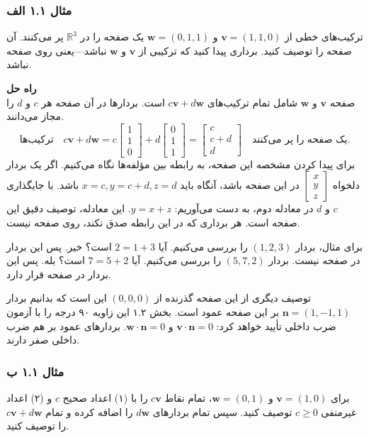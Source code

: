 \documentclass[12pt, a4paper]{book}
\begin{document}
	\subsubsection*{مثال ۱.۱ الف}
	ترکیب‌های خطی از $\mathbf{v} = (1,1,0)$ و $\mathbf{w} = (0,1,1)$ یک صفحه را در $\mathbb{R}^3$ پر می‌کنند. آن صفحه را توصیف کنید. برداری پیدا کنید که ترکیبی از $\mathbf{v}$ و $\mathbf{w}$ نباشد—یعنی روی صفحه نباشد.
	
	\textbf{راه حل} \\
	صفحه $\mathbf{v}$ و $\mathbf{w}$ شامل تمام ترکیب‌های $c\mathbf{v} + d\mathbf{w}$ است. بردارها در آن صفحه هر $c$ و $d$ را مجاز می‌دانند.
	\[ \text{ترکیب‌ها} \quad c\mathbf{v} + d\mathbf{w} = c\begin{bmatrix} 1 \\ 1 \\ 0 \end{bmatrix} + d\begin{bmatrix} 0 \\ 1 \\ 1 \end{bmatrix} = \begin{bmatrix} c \\ c+d \\ d \end{bmatrix} \quad \text{یک صفحه را پر می‌کنند.} \]
	برای پیدا کردن مشخصه این صفحه، به رابطه بین مؤلفه‌ها نگاه می‌کنیم. اگر یک بردار دلخواه $\begin{bmatrix} x \\ y \\ z \end{bmatrix}$ در این صفحه باشد، آنگاه باید $x=c, y=c+d, z=d$ باشد. با جایگذاری $c$ و $d$ در معادله دوم، به دست می‌آوریم: $y = x+z$. این معادله، توصیف دقیق این صفحه است. هر برداری که در این رابطه صدق نکند، روی صفحه نیست.
	
	برای مثال، بردار $(1,2,3)$ را بررسی می‌کنیم. آیا $2 = 1+3$ است؟ خیر. پس این بردار در صفحه نیست.
	بردار $(5,7,2)$ را بررسی می‌کنیم. آیا $7 = 5+2$ است؟ بله. پس این بردار در صفحه قرار دارد.
	
	توصیف دیگری از این صفحه گذرنده از $(0,0,0)$ این است که بدانیم بردار $\mathbf{n} = (1, -1, 1)$ بر این صفحه عمود است. بخش ۱.۲ این زاویه ۹۰ درجه را با آزمون ضرب داخلی تأیید خواهد کرد: $\mathbf{v} \cdot \mathbf{n} = 0$ و $\mathbf{w} \cdot \mathbf{n} = 0$. بردارهای عمود بر هم ضرب داخلی صفر دارند.
	
	\subsubsection*{مثال ۱.۱ ب}
	برای $\mathbf{v}=(1,0)$ و $\mathbf{w}=(0,1)$، تمام نقاط $c\mathbf{v}$ را با (۱) اعداد صحیح $c$ و (۲) اعداد غیرمنفی $c \ge 0$ توصیف کنید. سپس تمام بردارهای $d\mathbf{w}$ را اضافه کرده و تمام $c\mathbf{v} + d\mathbf{w}$ را توصیف کنید.
	
\end{document}
